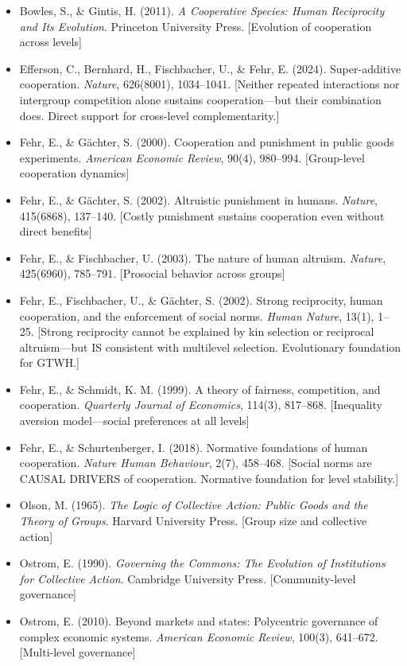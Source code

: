 \begin{itemize}

\item Bowles, S., \& Gintis, H. (2011). 
\textit{A Cooperative Species: Human Reciprocity and Its Evolution}. 
Princeton University Press.
[Evolution of cooperation across levels]

\item Efferson, C., Bernhard, H., Fischbacher, U., \& Fehr, E. (2024).
Super-additive cooperation.
\textit{Nature}, 626(8001), 1034--1041.
[Neither repeated interactions nor intergroup competition alone sustains cooperation---but their combination does. Direct support for cross-level complementarity.]

\item Fehr, E., \& Gächter, S. (2000). 
Cooperation and punishment in public goods experiments. 
\textit{American Economic Review}, 90(4), 980--994.
[Group-level cooperation dynamics]

\item Fehr, E., \& Gächter, S. (2002).
Altruistic punishment in humans.
\textit{Nature}, 415(6868), 137--140.
[Costly punishment sustains cooperation even without direct benefits]

\item Fehr, E., \& Fischbacher, U. (2003). 
The nature of human altruism. 
\textit{Nature}, 425(6960), 785--791.
[Prosocial behavior across groups]

\item Fehr, E., Fischbacher, U., \& Gächter, S. (2002).
Strong reciprocity, human cooperation, and the enforcement of social norms.
\textit{Human Nature}, 13(1), 1--25.
[Strong reciprocity cannot be explained by kin selection or reciprocal altruism---but IS consistent with multilevel selection. Evolutionary foundation for GTWH.]

\item Fehr, E., \& Schmidt, K. M. (1999).
A theory of fairness, competition, and cooperation.
\textit{Quarterly Journal of Economics}, 114(3), 817--868.
[Inequality aversion model---social preferences at all levels]

\item Fehr, E., \& Schurtenberger, I. (2018).
Normative foundations of human cooperation.
\textit{Nature Human Behaviour}, 2(7), 458--468.
[Social norms are CAUSAL DRIVERS of cooperation. Normative foundation for level stability.]

\item Olson, M. (1965). 
\textit{The Logic of Collective Action: Public Goods and the Theory of Groups}. 
Harvard University Press.
[Group size and collective action]

\item Ostrom, E. (1990). 
\textit{Governing the Commons: The Evolution of Institutions for Collective Action}. 
Cambridge University Press.
[Community-level governance]

\item Ostrom, E. (2010). 
Beyond markets and states: Polycentric governance of complex economic systems. 
\textit{American Economic Review}, 100(3), 641--672.
[Multi-level governance]

\end{itemize}

